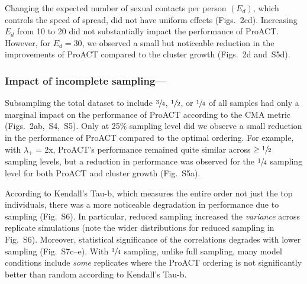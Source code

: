 \documentclass[a4paper,10pt]{article}
\newcommand{\PLWH}{sample\xspace}
\begin{document}
Changing the expected number of sexual contacts per person $\left(E_d\right)$, which controls the speed of spread, did not have uniform effects (Figs.~2cd). 
Increasing $E_d$ from 10 to 20 did not substantially impact the performance of ProACT. However, for $E_d=30$, we observed a small but noticeable reduction in the improvements of ProACT compared to the cluster growth (Figs.~2d and~S5d).




\subsubsection{Impact of incomplete sampling---}
Subsampling the total dataset to include $\sfrac{3}{4}$, $\sfrac{1}{2}$, or $\sfrac{1}{4}$ of all \PLWH{s} had only a marginal impact on the performance of ProACT according to the CMA metric  (Figs.~2ab,~S4,~S5). 
Only at 25\% sampling level did we observe a small reduction in the performance of ProACT compared to the optimal ordering. 
For example, 
with $\lambda_{+}=2$x, ProACT's performance remained quite similar across $\geq \sfrac{1}{2}$ sampling levels, but a reduction in performance was observed for the $\sfrac{1}{4}$ sampling level for both ProACT and  cluster growth  (Fig.~S5a).


According to Kendall's Tau-b, which measures the entire order not just the top individuals, there was a more noticeable degradation in performance due to sampling (Fig.~S6). 
In particular, reduced sampling increased the \textit{variance} across replicate simulations (note the wider distributions for reduced sampling in Fig.~S6).
Moreover, statistical significance of the correlations degrades with lower sampling (Fig.~S7c--e).
With  $\sfrac{1}{4}$ sampling, unlike full sampling, many model conditions include {\em some} replicates where the ProACT ordering is not significantly better than random according to Kendall's Tau-b.
\end{document}
